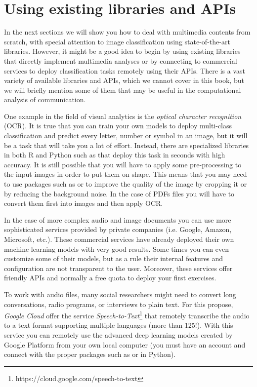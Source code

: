 \section{Using existing libraries and APIs}
\label{sec:apivisions}

In the next sections we will show you how to deal with multimedia contents from scratch, with special attention to image classification using state-of-the-art libraries. However, it might be a good idea to begin by using existing libraries that directly implement multimedia analyses or by connecting to commercial services to deploy classification tasks remotely using their APIs. There is a vast variety of available libraries and APIs, which we cannot cover in this book, but we will briefly mention some of them that may be useful in the computational analysis of communication.

One example in the field of visual analytics is the \textit{optical character recognition} (OCR). It is true that you can train your own models to deploy multi-class classification and predict every letter, number or symbol in an image, but it will be a task that will take you a lot of effort. Instead, there are specialized libraries in both R and Python such as  that deploy this task in seconds with high accuracy. It is still possible that you will have to apply some pre-processing to the input images in order to put them on shape. This means that you may need to use packages such as  or  to improve the quality of the image by cropping it or by reducing the background noise.  In the case of PDFs files you will have to convert them first into images and then apply OCR.

In the case of more complex audio and image documents you can use more sophisticated services provided by private companies (i.e. Google, Amazon, Microsoft, etc.). These commercial services have already deployed their own machine learning models with very good results. Some times you can even customize some of their models, but as a rule their internal features and configuration are not transparent to the user. Moreover, these services offer friendly APIs and normally a free quota to deploy your first exercises.

To work with audio files, many social researchers might need to convert long conversations, radio programs, or interviews to plain text. For this propose, \textit{Google Cloud} offer the service \textit{Speech-to-Text}\footnote{https://cloud.google.com/speech-to-text}  that remotely transcribe the audio to a text format supporting multiple languages (more than 125!). With this service you can remotely use the advanced deep learning models created by Google Platform from your own local computer (you must have an account and connect with the proper packages such as  or  in Python).

